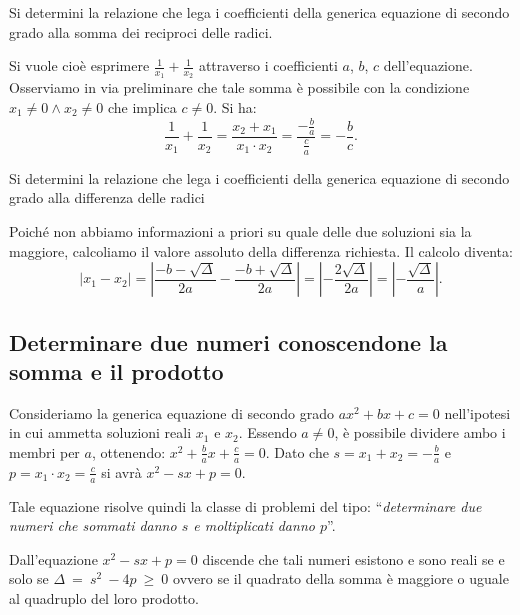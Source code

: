 \begin{exrig}
\begin{esempio}
Si determini la relazione che lega i coefficienti della generica equazione di 
secondo grado alla somma dei reciproci delle radici.

Si vuole cioè esprimere $\frac{1}{x_{1}} + \frac{1}{x_{2}}$ attraverso i 
coefficienti $a$, $b$, $c$ dell'equazione. Osserviamo in via preliminare che 
tale somma è possibile con la condizione $x_{1} \neq 0 \wedge x_{2} \neq 0$ che 
implica $c \neq 0$. Si ha: 
\[\frac{1}{x_{1}} + \frac{1}{x_{2}} = \frac{x_{2} + x_{1}}{x
_{1} \cdot x_{2}} = \frac{- \frac{b}{a}}{\frac{c}{a}} = - \frac{b}{c}.\]
\end{esempio}

\begin{esempio}
Si determini la relazione che lega i coefficienti della generica equazione di 
secondo grado alla differenza delle radici

Poiché non abbiamo informazioni a priori su quale delle due soluzioni sia la 
maggiore, calcoliamo il valore assoluto della differenza richiesta. Il calcolo 
diventa: \[
\left\lvert x_{1} - x_{2} \right\rvert = \left\lvert \frac{- b -\sqrt{\Delta}}{2 
a} - \frac{- b + \sqrt{\Delta}}{2 a} \right\rvert =\left\lvert - \frac{2 
\sqrt{\Delta}}{2 a} \right\rvert = \left\lvert -\frac{\sqrt{\Delta}}{a} 
\right\rvert.
\]
\end{esempio}
\end{exrig}

\subsection{Determinare due numeri conoscendone la somma e il prodotto}

Consideriamo la generica equazione di secondo grado $a x^{2} + bx + c = 0$ 
nell'ipotesi in cui ammetta soluzioni reali $x_{1}$ e $x_{2}$. Essendo $a \neq 
0$, è possibile dividere ambo i membri per $a$, ottenendo: $x^{2} + \frac{b}{a} 
x + \frac{c}{a} = 0$. Dato che $s = x_{1} + x_{2} = - \frac{b}{a}$ e $p = x_{1} 
\cdot x_{2} = \frac{c}{a}$ si avrà $x^{2} - s x + p = 0$.

Tale equazione risolve quindi la classe di problemi del tipo: 
``\emph{determinare due numeri che sommati danno $s$ e moltiplicati danno 
$p$}''.

Dall'equazione $x^{2} - s x + p = 0$ discende che tali numeri esistono e sono 
reali se e solo se $\Delta~=~s^{2}~-4p~\geq~0$ ovvero se il quadrato della somma 
è maggiore o uguale al quadruplo del loro prodotto.

